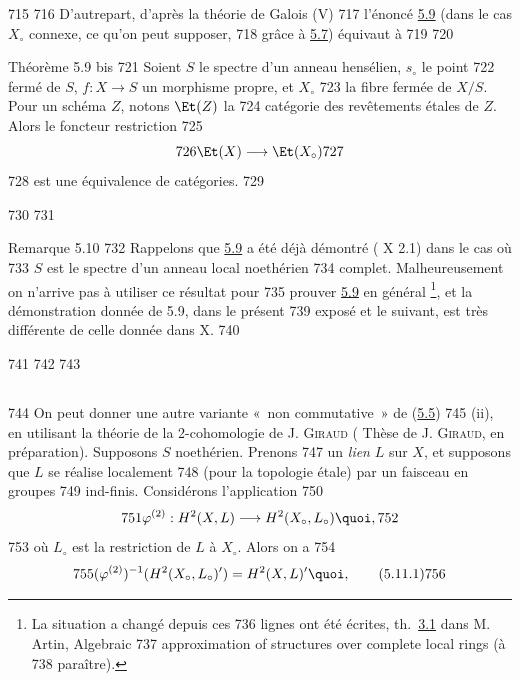    715	
   716	D'autre\pageoriginale part, d'après la théorie de Galois (\SGA V)
   717	l'énoncé \hyperref[XII.thm5.9]{5.9} (dans le cas $X_{\circ}$ connexe, ce qu'on peut supposer,
   718	grâce à \hyperref[XII.cor5.7]{5.7}) équivaut à
   719	
   720	\begin{enonce*}{Théorème 5.9 bis}
   721	Soient $S$ le spectre d'un anneau hensélien, $s_{\circ}$ le point
   722	fermé de $S$, $f:X\rightarrow S$ un morphisme propre, et $X_{\circ}$
   723	la fibre fermée de $X/S$. Pour un schéma $Z$, notons $\Et(Z)$ la
   724	catégorie des revêtements étales de $Z$. Alors le foncteur restriction
   725	$$
   726	\Et(X)\longrightarrow \Et(X_{\circ})
   727	$$
   728	est une équivalence de catégories.
   729	\end{enonce*}
   730	
   731	\begin{enonce*}[remark]{Remarque 5.10}
   732	Rappelons que \hyperref[XII.thm5.9]{5.9} a été déjà démontré ( X 2.1) dans le cas où
   733	$S$ est le spectre d'un anneau local noethérien
   734	complet. Malheureusement on n'arrive pas à utiliser ce résultat pour
   735	prouver \hyperref[XII.thm5.9]{5.9} en général \footnote[1]{La situation a changé depuis ces
   736	  lignes ont été écrites, \cf th.~\hyperref[XII.prop3.1]{3.1} dans M. Artin, Algebraic
   737	  approximation of structures over complete local rings (à
   738	  paraître).}, et la démonstration donnée de 5.9, dans le présent
   739	exposé et le suivant, est très différente de celle donnée dans  X.
   740	\end{enonce*}
   741	
   742	\setcounter{subsection}{10}
   743	\subsection{}
   744	On peut donner une autre variante « non commutative »  de (\hyperref[XII.cor5.5]{5.5})
   745	(ii), en utilisant la théorie de la 2-cohomologie de J. \textsc{Giraud} (	Thèse de J. \textsc{Giraud}, en préparation). Supposons $S$ noethérien. Prenons
   747	un \emph{lien} $L$ sur $X$, et supposons que $L$ se réalise localement
   748	(pour la topologie étale) par un faisceau en groupes
   749	ind-finis. Considérons l'application
   750	$$
   751	\varphi^{(2)}:H^2(X,L)\longrightarrow H^2(X_{\circ},L_{\circ}){\quoi},
   752	$$
   753	où $L_{\circ}$ est la restriction de $L$ à $X_{\circ}$. Alors on a
   754	\begin{equation*}
   755	(\varphi^{(2)})^{-1}(H^2(X_{\circ},L_{\circ})')=H^2(X,L)'{\quoi},\tag{5.11.1}
   756	\end{equation*}
